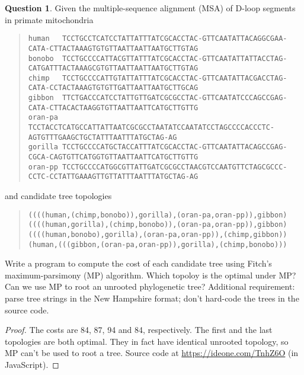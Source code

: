 \documentclass{article}[10pt]
\theoremstyle{definition}\newtheorem{question}{Question}
\begin{document}
\begin{question}
Given the multiple-sequence alignment (MSA) of D-loop segments in primate mitochondria
\begin{quote}
\footnotesize\verb|human   TCCTGCCTCATCCTATTATTTATCGCACCTAC-GTTCAATATTACAGGCGAA-CATA-CTTACTAAAGTGTGTTAATTAATTAATGCTTGTAG|\\
\footnotesize\verb|bonobo  TCCTGCCCCATTACGTTATTTATCGCACCTAC-GTTCAATATTATTACCTAG-CATGATTTACTAAAGCGTGTTAATTAATTAATGCTTGTAG|\\
\footnotesize\verb|chimp   TCCTGCCCCATTGTATTATTTATCGCACCTAC-GTTCAATATTACGACCTAG-CATA-CCTACTAAAGTGTGTTGATTAATTAATGCTTGCAG|\\
\footnotesize\verb|gibbon  TTCTGACCCATCCTATTGTTGATCGCGCCTAC-GTTCAATATCCCAGCCGAG-CATA-CTTACACTAAGGTGTTAATTAATTCATGCTTGTTG|\\
\footnotesize\verb|oran-pa TCCTACCTCATGCCATTATTAATCGCGCCTAATATCCAATATCCTAGCCCCACCCTC-AGTGTTTGAAGCTGCTATTTAATTTATGCTAG-AG|\\
\footnotesize\verb|gorilla TCCTGCCCCATGCTACCATTTATCGCACCTAC-GTTCAATATTACAGCCGAG-CGCA-CAGTGTTCATGGTGTTAATTAATTCATGCTTGTTG|\\
\footnotesize\verb|oran-pp TCCTGCCCCATGGCGTTATTGATCGCGCCTAACGTCCAATGTTCTAGCGCCC-CCTC-CCTATTGAAAGTTGTTATTTAATTTATGCTAG-AG|
\end{quote}
and candidate tree topologies
\begin{quote}
\footnotesize\tt ((((human,(chimp,bonobo)),gorilla),(oran-pa,oran-pp)),gibbon)\\
\footnotesize\tt ((((human,gorilla),(chimp,bonobo)),(oran-pa,oran-pp)),gibbon)\\
\footnotesize\tt ((((human,bonobo),gorilla),(oran-pa,oran-pp)),(chimp,gibbon))\\
\footnotesize\tt (human,(((gibbon,(oran-pa,oran-pp)),gorilla),(chimp,bonobo)))
\end{quote}
Write a program to compute the cost of each candidate tree using Fitch's maximum-parsimony (MP) algorithm.
Which topoloy is the optimal under MP? Can we use MP to root an unrooted phylogenetic tree?
Additional requirement: parse tree strings in the New Hampshire format; don't hard-code the trees in the source code.
\end{question}

\begin{proof}
The costs are 84, 87, 94 and 84, respectively. The first and the last topologies are both optimal.
They in fact have identical unrooted topology, so MP can't be used to root a tree.
Source code at \url{https://ideone.com/TnhZ6O} (in JavaScript).
\end{proof}
\end{document}
